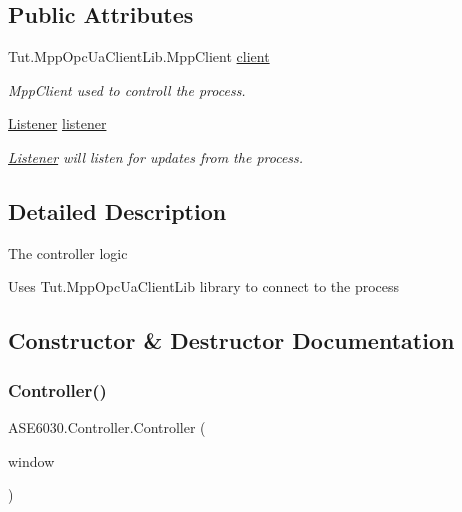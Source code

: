 \subsection*{Public Attributes}
\begin{DoxyCompactItemize}
\item 
\mbox{\label{class_a_s_e6030_1_1_controller_a36785106c3f4bc54402290b0d86911fc}} 
Tut.\+Mpp\+Opc\+Ua\+Client\+Lib.\+Mpp\+Client \hyperlink{class_a_s_e6030_1_1_controller_a36785106c3f4bc54402290b0d86911fc}{client}
\begin{DoxyCompactList}\small\item\em Mpp\+Client used to controll the process. \end{DoxyCompactList}\item 
\mbox{\label{class_a_s_e6030_1_1_controller_a8cc31711b16a81099afb9ad6125d1d0f}} 
\hyperlink{class_a_s_e6030_1_1_listener}{Listener} \hyperlink{class_a_s_e6030_1_1_controller_a8cc31711b16a81099afb9ad6125d1d0f}{listener}
\begin{DoxyCompactList}\small\item\em \hyperlink{class_a_s_e6030_1_1_listener}{Listener} will listen for updates from the process. \end{DoxyCompactList}\end{DoxyCompactItemize}


\subsection{Detailed Description}
The controller logic 

Uses Tut.\+Mpp\+Opc\+Ua\+Client\+Lib library to connect to the process 

\subsection{Constructor \& Destructor Documentation}
\mbox{\label{class_a_s_e6030_1_1_controller_aa7df468c34d983c6efe88f12abeffb79}} 
\subsubsection{\texorpdfstring{Controller()}{Controller()}}
{\footnotesize\ttfamily A\+S\+E6030.\+Controller.\+Controller (\begin{DoxyParamCaption}\item[{\hyperlink{class_a_s_e6030_1_1_main_window}{Main\+Window}}]{window }\end{DoxyParamCaption})\hspace{0.3cm}{\ttfamily [inline]}}




